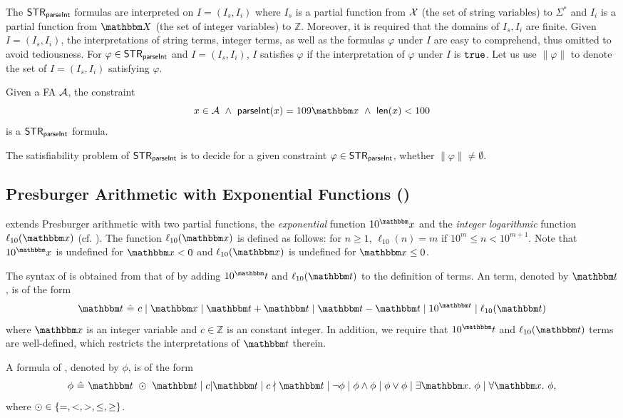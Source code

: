 The ${\sf STR}_{\textsf{parseInt}}$ formulas are interpreted on $I=(I_s, I_i)$ where $I_s$ is a partial function from $\mathcal{X}$ (the set of string variables) to $\Sigma^*$ and $I_i$ is a partial function from $\ivars$ (the set of integer variables) to $\mathbb Z$. 
Moreover, it is required that the domains of $I_s, I_i$ are finite. Given $I = (I_s, I_i)$, the interpretations of string terms, integer terms, as well as the formulas $\varphi$ under $I$ are easy to comprehend, thus omitted to avoid tediousness. 
For $\varphi \in {\sf STR}_{\textsf{parseInt}}$ and $I = (I_s, I_i)$, $I$ satisfies $\varphi$ if the interpretation of $\varphi$ under $I$ is $\mathtt{true}$.
Let us use $\lVert \varphi \rVert$ to denote the set of $I = (I_s, I_i)$ satisfying $\varphi$.

\begin{example} Given a FA $\mathcal{A}$, the constraint
$$\svarx \in \Aut \ \wedge\ 
\parseInt(\svarx) = 109\ivarx\ \wedge\ 
\len(\svarx) < 100$$
is a ${\sf STR}_{\textsf{parseInt}}$ formula.
\end{example}

The satisfiability problem of ${\sf STR}_{\textsf{parseInt}}$ is to decide for a given constraint $\varphi \in {\sf STR}_{\textsf{parseInt}}$,
whether $\lVert  \varphi \rVert \neq \emptyset$.

\subsection{Presburger Arithmetic with Exponential Functions (\paexp)}

{\paexp} extends Presburger arithmetic with two partial functions, the \emph{exponential} function $10^\ivarx$ and the \emph{integer logarithmic} function $\ell_{10}(\ivarx)$ (cf. \cite{Point86}). The function $\ell_{10}(\ivarx)$ is defined as follows: for $n \ge 1$, $\ell_{10}(n) = m$ if $10^m \le n < 10^{m+1}$. Note that $10^\ivarx$ is undefined for $\ivarx<0$ and $\ell_{10}(\ivarx)$ is undefined for $\ivarx\le 0$.

The syntax of {\paexp} is obtained from that of {\pa} by adding $10^\iterm$ and $\ell_{10}(\iterm)$ to the definition of terms. An {\paexp} term, denoted by $\iterm$, is of the form
$$\iterm\ \Def\ c \mid \ivarx \mid \iterm + \iterm \mid \iterm - \iterm \mid 10^{\iterm} \mid \ell_{10}(\iterm) $$
where $\ivarx$ is an integer variable and $c\in \mathbb Z$ is an constant integer. In addition, we require that $10^\iterm$ and $\ell_{10}(\iterm)$ terms are well-defined, which restricts the interpretations of $\iterm$ therein.

A formula of {\paexp}, denoted by $\phi$, is of the form
$$\phi \ \Def \ \iterm \ \op\ \iterm \mid c \vert \iterm \mid c \nmid \iterm \mid \neg \phi \mid \phi \wedge \phi \mid \phi \vee \phi \mid \exists \ivarx.\ \phi \mid \forall \ivarx.\ \phi,$$
where $\odot \in \{=, < , >, \le, \ge\}$. 

